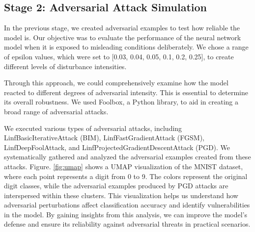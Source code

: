 \documentclass[10pt, conference, a4paper, final]{IEEEtran}
\begin{document}
\subsection{Stage 2: Adversarial Attack Simulation}

In the previous stage, we created adversarial examples to test how reliable the model is. Our objective was to evaluate the performance of the neural network model when it is exposed to misleading conditions deliberately. We chose a range of epsilon values, which were set to [0.03, 0.04, 0.05, 0.1, 0.2, 0.25], to create different levels of disturbance intensities.

Through this approach, we could comprehensively examine how the model reacted to different degrees of adversarial intensity. This is essential to determine its overall robustness. We used Foolbox, a Python library, to aid in creating a broad range of adversarial attacks.

We executed various types of adversarial attacks, including LinfBasicIterativeAttack (BIM), LinfFastGradientAttack (FGSM), LinfDeepFoolAttack, and LinfProjectedGradientDescentAttack (PGD). We systematically gathered and analyzed the adversarial examples created from these attacks.
Figure. \ref{fig:umap} shows a UMAP visualization of the MNIST dataset, where each point represents a digit from 0 to 9. The colors represent the original digit classes, while the adversarial examples produced by PGD attacks are interspersed within these clusters. This visualization helps us understand how adversarial perturbations affect classification accuracy and identify vulnerabilities in the model. By gaining insights from this analysis, we can improve the model's defense and ensure its reliability against adversarial threats in practical scenarios.
\end{document}
